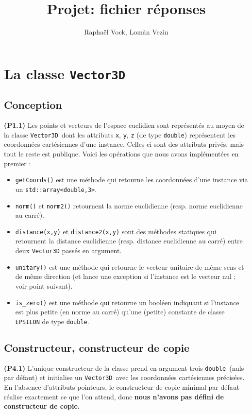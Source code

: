 \documentclass[12pt, letterpaper, twoside]{article}
\title{Projet: fichier réponses}
\author{Raphaël Vock, Lomàn Vezin}
\newcommand{\T}[1]{\texttt{#1}}
\newcommand{\V}[0]{\texttt{Vector3D}}
\newcommand{\double}{\texttt{double}}
\begin{document}
\maketitle
\section{La classe \T{Vector3D}}
\subsection{Conception}
\noindent \textbf{(P1.1)} Les points et vecteurs de l'espace euclidien sont représentés au moyen de la classe \V\ dont les attributs \T{x}, \T{y}, \T{z} (de type \double) représentent les coordonnées cartésiennes d'une instance. Celles-ci sont des attributs privés, mais tout le reste est publique. Voici les opérations que nous avons implémentées en premier :

\begin{itemize}

\item \T{getCoords()}  est une méthode qui retourne les coordonnées d'une instance via un \T{std::array<double,3>}.

\item \T{norm()} et \T{norm2()} retournent la norme euclidienne (resp. norme euclidienne au carré).

\item \T{distance(x,y)} et \T{distance2(x,y)} sont des méthodes statiques qui retournent la distance euclidienne (resp. distance euclidienne au carré) entre deux \T{Vector3D} passés en argument.

\item \T{unitary()} est une méthode qui retourne le vecteur unitaire de même sens et de même direction (et lance une exception si l'instance est le vecteur nul ; voir point suivant).

\item \T{is\_zero()} est une méthode qui retourne un booléen indiquant si l'instance est plus petite (en norme au carré) qu'une (petite) constante de classe \T{EPSILON} de type \double.
\end{itemize}

\subsection{Constructeur, constructeur de copie}
\noindent \textbf{(P4.1)} L'unique constructeur de la classe prend en argument trois \double\ (nuls par défaut) et initialise un \V\ avec les coordonnées cartésiennes précisées. En l'absence d'attributs pointeurs, le constructeur de copie minimal par défaut réalise exactement ce que l'on attend, donc \textbf{nous n'avons pas défini de constructeur de copie.}
\end{document}
